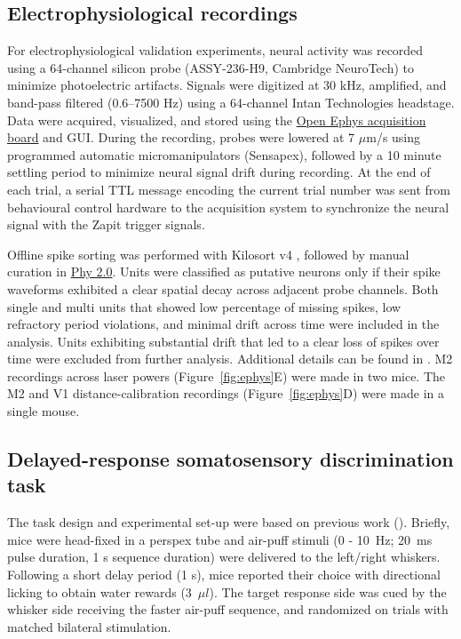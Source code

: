 \documentclass[9pt,lineno]{elife}
\begin{document}
\subsection{Electrophysiological recordings}

For electrophysiological validation experiments, neural activity was recorded using a 64-channel silicon probe (ASSY-236-H9, Cambridge NeuroTech) to minimize photoelectric artifacts.
Signals were digitized at 30 kHz, amplified, and band-pass filtered (0.6–7500 Hz) using a 64-channel Intan Technologies headstage.
Data were acquired, visualized, and stored using the \href{https://open-ephys.github.io/acq-board-docs/}{Open Ephys acquisition board} and GUI.
During the recording, probes were lowered at 7 $\mu$m/s using programmed automatic micromanipulators (Sensapex), followed by a 10 minute settling period to minimize neural signal drift during recording.
At the end of each trial, a serial TTL message encoding the current trial number was sent from behavioural control hardware to the acquisition system to synchronize the neural signal with the Zapit trigger signals.

Offline spike sorting was performed with Kilosort v4 \citep{Pachitariu2024SpikeKilosort4}, followed by manual curation in \href{https://github.com/cortex-lab/phy}{Phy 2.0}.
Units were classified as putative neurons only if their spike waveforms exhibited a clear spatial decay across adjacent probe channels.
Both single and multi units that showed low percentage of missing spikes, low refractory period violations, and minimal drift across time were included in the analysis.
Units exhibiting substantial drift that led to a clear loss of spikes over time were excluded from further analysis.
Additional details can be found in \citealp{Gauld2025AActions}.
M2 recordings across laser powers (Figure~\ref{fig:ephys}E) were made in two mice.
The M2 and V1 distance-calibration recordings (Figure~\ref{fig:ephys}D) were made in a single mouse.

\subsection{Delayed-response somatosensory discrimination task}

The task design and experimental set-up were based on previous work (\citealp{Gauld2024APerception,Gauld2025AActions}).
Briefly, mice were head-fixed in a perspex tube and air-puff stimuli (0 - 10~Hz; 20~ms pulse duration, 1 s sequence duration) were delivered to the left/right whiskers.
Following a short delay period (1 s), mice reported their choice with directional licking to obtain water rewards (3~$\mu l$).
The target response side was cued by the whisker side receiving the faster air-puff sequence, and randomized on trials with matched bilateral stimulation.
\end{document}
